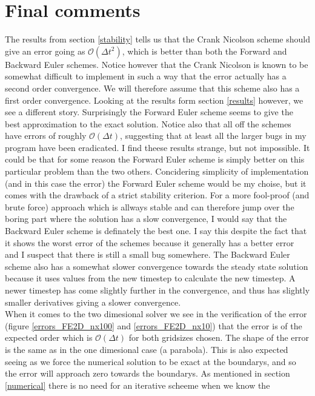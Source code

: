 \documentclass[a4paper,english, 10pt, twoside]{article}
\begin{document}
\section{Final comments}\label{summary}
The results from section \ref{stability} tells us that the Crank Nicolson scheme should give an error going as $\mathcal{O}(\Delta t^2)$, which is 
better than both the Forward and Backward Euler schemes. Notice however that the Crank Nicolson is known to be somewhat difficult to implement in 
such a way that the error actually has a second order convergence. We will therefore assume that this scheme also has a first order convergence. 
Looking at the results form section \ref{results} however, we see a different story. 
Surprisingly the Forward Euler scheme seems to give the best approximation to the exact solution. Notice also that all off the schemes have errors of 
roughly $\mathcal{O}(\Delta t)$, suggesting that at least all the larger bugs in my program have been eradicated. I find theese results strange, but 
not impossible. It could be that for some reason the Forward Euler scheme is simply better on this particular problem than the two others. 
Concidering simplicity of implementation (and in this case the error) the Forward Euler scheme would be my choise, but it comes with the drawback 
of a strict stability criterion. For a more fool-proof (and brute force) approach which is allways stable and can therefore jump over the boring 
part where the solution has a slow convergence, I would say that the Backward Euler scheme is definately the best one. I say this despite the fact that 
it shows the worst error of the schemes because it generally has a better error and I suspect that there is still a small bug somewhere. 
The Backward Euler scheme also has a somewhat slower convergence towards the steady state solution because it uses values from the new timestep 
to calculate the new timestep. A newer timestep has come slightly further in the convergence, and thus has slightly smaller derivatives giving 
a slower convergence.\\
When it comes to the two dimesional solver we see in the verification of the error (figure \ref{errors_FE2D_nx100} and \ref{errors_FE2D_nx10}) that 
the error is of the expected order which is $\mathcal{O}(\Delta t)$ for both gridsizes chosen.  The shape of the error is the same as in the 
one dimesional case (a parabola). This is also expected seeing as we force the numerical solution to be exact at the boundarys, and so the error 
will approach zero towards the boundarys. As mentioned in section \ref{numerical} there is no need for an iterative scheeme when we know the 
\end{document}
